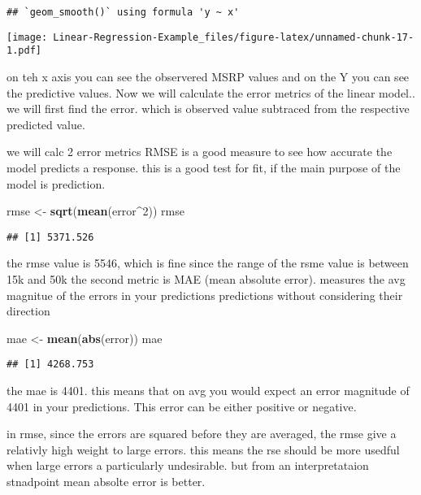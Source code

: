 \documentclass[
]{article}
\newenvironment{Shaded}{\begin{snugshade}}{\end{snugshade}}
\newcommand{\DecValTok}[1]{\textcolor[rgb]{0.00,0.00,0.81}{#1}}
\newcommand{\KeywordTok}[1]{\textcolor[rgb]{0.13,0.29,0.53}{\textbf{#1}}}
\newcommand{\NormalTok}[1]{#1}
\newcommand{\OperatorTok}[1]{\textcolor[rgb]{0.81,0.36,0.00}{\textbf{#1}}}
\newcommand{\StringTok}[1]{\textcolor[rgb]{0.31,0.60,0.02}{#1}}
\begin{document}
\begin{verbatim}
## `geom_smooth()` using formula 'y ~ x'
\end{verbatim}

\texttt{[image: Linear-Regression-Example\_files/figure-latex/unnamed-chunk-17-1.pdf]}

on teh x axis you can see the observered MSRP values and on the Y you
can see the predictive values. Now we will calculate the error metrics
of the linear model.. we will first find the error. which is observed
value subtraced from the respective predicted value.

\begin{Shaded}
\end{Shaded}

we will calc 2 error metrics RMSE is a good measure to see how accurate
the model predicts a response. this is a good test for fit, if the main
purpose of the model is prediction.

\begin{Shaded}
\begin{Highlighting}[]
\NormalTok{rmse <-}\StringTok{ }\KeywordTok{sqrt}\NormalTok{(}\KeywordTok{mean}\NormalTok{(error}\OperatorTok{^}\DecValTok{2}\NormalTok{))}
\NormalTok{rmse}
\end{Highlighting}
\end{Shaded}

\begin{verbatim}
## [1] 5371.526
\end{verbatim}

the rmse value is 5546, which is fine since the range of the rsme value
is between 15k and 50k the second metric is MAE (mean absolute error).
measures the avg magnitue of the errors in your predictions predictions
without considering their direction

\begin{Shaded}
\begin{Highlighting}[]
\NormalTok{mae <-}\StringTok{ }\KeywordTok{mean}\NormalTok{(}\KeywordTok{abs}\NormalTok{(error))}
\NormalTok{mae}
\end{Highlighting}
\end{Shaded}

\begin{verbatim}
## [1] 4268.753
\end{verbatim}

the mae is 4401. this means that on avg you would expect an error
magnitude of 4401 in your predictions. This error can be either positive
or negative.

in rmse, since the errors are squared before they are averaged, the rmse
give a relativly high weight to large errors. this means the rse should
be more usedful when large errors a particularly undesirable. but from
an interpretataion stnadpoint mean absolte error is better.
\end{document}
